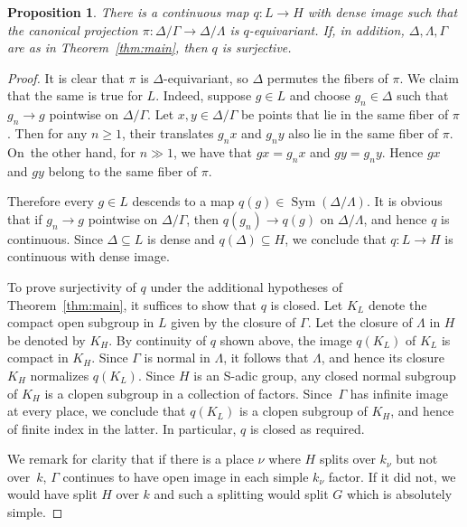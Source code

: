 \documentclass[11pt]{article}
\numberwithin{equation}{section}\providecommand{\llangle}{\langle\!\langle}\providecommand{\rrangle}{\rangle\!\rangle}\providecommand{\Asterisk}{\ast}
\DeclareMathOperator{\Sym}{Sym}
\newtheorem{prop}[thm]{Proposition}
\theoremstyle{definition}
\begin{document}
\begin{prop}\label{prop-contclosed}\label{prop:LtoH}
There is a continuous map $q:L\to H$ with dense image such that the canonical projection $\pi: \Delta / \Gamma\to \Delta / \Lambda$ is $q$-equivariant.
If, in addition, $\Delta, \Lambda, \Gamma$ are as in Theorem~\ref{thm:main}, then $q$ is surjective.
\end{prop}
\begin{proof} It is clear that $\pi$ is $\Delta$-equivariant, so $\Delta$ permutes the fibers of $\pi$. We claim that the same is true for $L$. Indeed, suppose $g\in L$ and choose $g_n\in\Delta$ such that $g_n\to g$ pointwise on $\Delta/\Gamma$. Let $x,y\in\Delta/\Gamma$ be points that lie in the same fiber of $\pi$. Then for any $n\geq 1$, their translates $g_n x$ and $g_n y$ also lie in the same fiber of $\pi$. On~the other hand, for $n \gg 1$, we have that $g x = g_n x$ and $g y = g_n y$. Hence $gx$ and $gy$ belong to the same fiber of $\pi$.

Therefore every $g\in L$ descends to a map $q(g)\in \Sym(\Delta/\Lambda)$. It is obvious that if $g_n\to g$ pointwise on $\Delta/\Gamma$, then $q(g_n)\to q(g)$ on $\Delta/\Lambda$, and hence $q$ is continuous. Since $\Delta\subseteq L$ is dense and $q(\Delta)\subseteq H$, we conclude that $q:L\to H$ is continuous with dense image.

To prove surjectivity of $q$ under the additional hypotheses of
Theorem~\ref{thm:main}, it suffices to show that $q$ is closed.
Let $K_L$ denote the compact open subgroup in $L$ given by the closure of $\Gamma$. Let the closure of $\Lambda$ in $H$ be denoted by $K_H$.
By continuity of $ q$ shown above, the image $q(K_L)$ of $K_L$ is compact in $K_H$.
Since $\Gamma$ is normal in $\Lambda$, it follows that $\Lambda$, and hence its closure $K_H$
normalizes $q(K_L)$.
Since $H$ is an S-adic group, any closed normal subgroup of $K_H$ is a clopen subgroup in a collection of factors. Since~$\Gamma$ has infinite image at every place, we conclude that $q(K_L)$ is a clopen subgroup of $K_H$, and hence
of finite index in the latter. In particular, $q$ is closed as required.

We remark for clarity that if there is a place $\nu$ where $H$ splits over $k_{\nu}$ but not over~$k$, $\Gamma$ continues to have open image in each simple $k_{\nu}$ factor. If it did not, we would have split $H$ over $k$ and such a splitting would split $G$ which is absolutely simple.
\end{proof}
\end{document}
